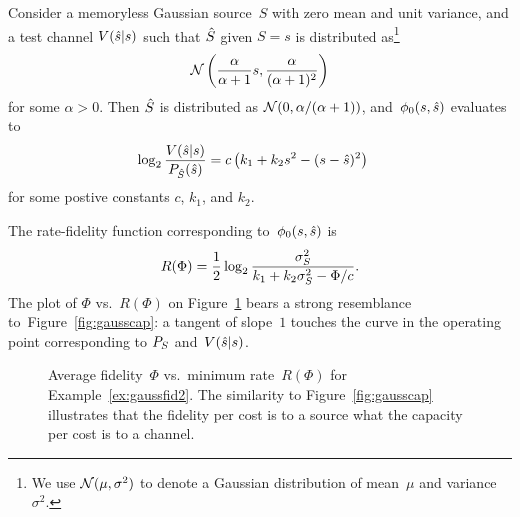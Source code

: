 \begin{example}[Gaussian]
  \label{ex:gaussfid2}
  Consider a memoryless Gaussian source~$S$ with zero mean and unit variance,
  and a test channel $V({\hat{s}}|s)$ such that ${\hat{S}}$ given $S=s$ is distributed
  as\footnote{We use $\mathcal{N}(\mu, \sigma^2)$ to denote a Gaussian distribution of
  mean~$\mu$ and variance~$\sigma^2$.}
  \[ \mathcal{N}\left( \frac{\alpha}{\alpha+1}s, \frac{ \alpha}{(\alpha+1)^2}
  \right) \]
  for some $\alpha > 0$. Then ${\hat{S}}$ is distributed as $\mathcal{N}(0, \alpha /
  (\alpha + 1))$, and~${\phi_0}(s,{\hat{s}})$ evaluates to
  \begin{align*}
    \log_2 \frac{V({\hat{s}}|s)}{{P_{\hat{S}}}({\hat{s}})} 
    &= c \left( k_1 + k_2 s^2 -(s-{\hat{s}})^2 \right)
  \end{align*}
  for some postive constants $c$, $k_1$, and $k_2$.
  
  The rate-fidelity function corresponding to~${\phi_0}(s,{\hat{s}})$ is
  \begin{equation*}
    R(\Phi) = \frac{1}{2} \log_2 \frac{{\sigma_S^2}}{k_1 + k_2 {\sigma_S^2} - \Phi/c}.
  \end{equation*}
  The plot of $\Phi$ vs.\ $R(\Phi)$ on Figure~\ref{fig:ratefidplot} bears a
  strong resemblance to~Figure~\ref{fig:gausscap}: a tangent of slope~$1$
  touches the curve in the operating point corresponding to ${P_S}$
  and~$V({\hat{s}}|s)$. 
  \begin{figure}[tbph]
    \begin{center}
    \end{center}
    \caption{Average fidelity~$\Phi$ vs.\ minimum rate~$R(\Phi)$ for
    Example~\ref{ex:gaussfid2}. The similarity to Figure~\ref{fig:gausscap}
    illustrates that the fidelity per cost is to a source what the capacity per
    cost is to a channel.}
    \label{fig:ratefidplot}
  \end{figure}
\end{example}

